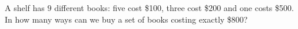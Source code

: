 A shelf has $9$ different books: five cost \$100, three cost \$200 and one costs \$500. In how many ways can we buy a set of books costing exactly \$800?
